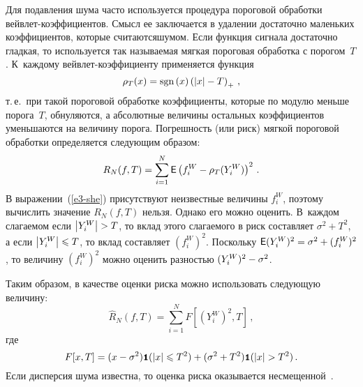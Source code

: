 \begin{multicols}{2}
Для подавления шума часто используется процедура пороговой обработки вейв\-лет-коэффициен\-тов. 
Смысл ее заключается в удалении достаточно маленьких коэффициентов, которые считаются\linebreak шумом. Если функция 
сигнала достаточно гладкая, то используется так называемая мягкая пороговая обработка с порогом~$T$. 
К~каждому вейв\-лет-ко\-эф\-фи\-ци\-ен\-ту применяется функция 
$$
\rho_T(x)\hm=\mathrm{sgn}\left(x\right)\left(\abs{x}\hm-T\right)_{+}\,,
$$
т.\,е.\
при такой пороговой обработ\-ке коэффициенты, которые по модулю меньше порога~$T$, обнуляются, а абсолютные величины остальных 
коэффициентов уменьшаются на величину порога.
Погрешность (или риск) мягкой пороговой обработки определяется следующим образом:
\begin{equation}
R_N(f,T)=\sum\limits_{i=1}^{N}{\sf E}\left(f^{W}_{i}-\rho_T(Y^W_i)\right)^2\,.\label{e3-she}
\end{equation}
В выражении~(\ref{e3-she}) присутствуют неизвестные величины $f^{W}_{i}$, поэтому вычислить значение $R_N(f,T)$ нельзя. 
Однако его можно оценить. В~каждом сла\-га\-емом если $\abs{Y^W_i}\hm>T$, то вклад этого сла\-га\-емо\-го в риск составляет $\sigma^2+T^2$, 
а если $\abs{Y^W_i}\hm\leqslant T$, то вклад составляет $(f_i^W)^2$. Поскольку ${\sf E}(Y_i^W)^2\hm=\sigma^2+(f_i^W)^2$, то
величину $(f_i^W)^2$ можно оценить разностью $(Y_i^W)^2\hm-\sigma^2$.

Таким образом, в качестве оценки риска можно использовать следующую величину:
\begin{equation}
\widehat{R}_N(f,T)=\sum\limits_{i=1}^{N}F[(Y_i^W)^2,T]\,, \label{e4-she}
\end{equation}
где  
$$
F[x,T]=(x-\sigma^2)\Ik(|x|\leqslant T^2)+
(\sigma^2+T^2)\Ik(|x|>T^2)\,.
$$
Если дисперсия шума известна, то оценка риска оказывается несмещенной~\cite{14-she}.


\end{multicols}
